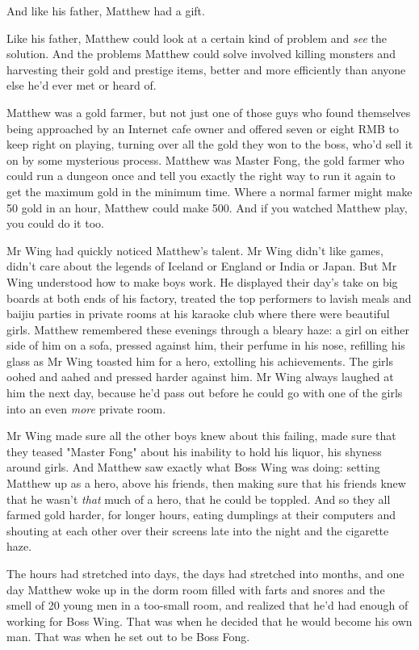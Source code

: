 And like his father, Matthew had a gift.

Like his father, Matthew could look at a certain kind of problem
and \emph{see} the solution. And the problems Matthew could solve
involved killing monsters and harvesting their gold and prestige
items, better and more efficiently than anyone else he'd ever met
or heard of.

Matthew was a gold farmer, but not just one of those guys who found
themselves being approached by an Internet cafe owner and offered
seven or eight RMB to keep right on playing, turning over all the
gold they won to the boss, who'd sell it on by some mysterious
process. Matthew was Master Fong, the gold farmer who could run a
dungeon once and tell you exactly the right way to run it again to
get the maximum gold in the minimum time. Where a normal farmer
might make 50 gold in an hour, Matthew could make 500. And if you
watched Matthew play, you could do it too.

Mr Wing had quickly noticed Matthew's talent. Mr Wing didn't like
games, didn't care about the legends of Iceland or England or India
or Japan. But Mr Wing understood how to make boys work. He
displayed their day's take on big boards at both ends of his
factory, treated the top performers to lavish meals and baijiu
parties in private rooms at his karaoke club where there were
beautiful girls. Matthew remembered these evenings through a bleary
haze: a girl on either side of him on a sofa, pressed against him,
their perfume in his nose, refilling his glass as Mr Wing toasted
him for a hero, extolling his achievements. The girls oohed and
aahed and pressed harder against him. Mr Wing always laughed at him
the next day, because he'd pass out before he could go with one of
the girls into an even \emph{more} private room.

Mr Wing made sure all the other boys knew about this failing, made
sure that they teased "Master Fong" about his inability to hold his
liquor, his shyness around girls. And Matthew saw exactly what Boss
Wing was doing: setting Matthew up as a hero, above his friends,
then making sure that his friends knew that he wasn't \emph{that}
much of a hero, that he could be toppled. And so they all farmed
gold harder, for longer hours, eating dumplings at their computers
and shouting at each other over their screens late into the night
and the cigarette haze.

The hours had stretched into days, the days had stretched into
months, and one day Matthew woke up in the dorm room filled with
farts and snores and the smell of 20 young men in a too-small room,
and realized that he'd had enough of working for Boss Wing. That
was when he decided that he would become his own man. That was when
he set out to be Boss Fong.

